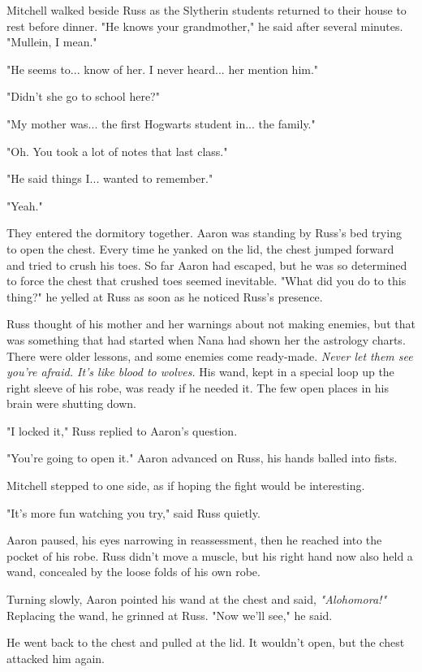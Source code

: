 \documentclass[a4paper,11pt]{article}
\begin{document}
Mitchell walked beside Russ as the Slytherin students returned to their house to rest before dinner. "He knows your grandmother," he said after several minutes. "Mullein, I mean."

"He seems to... know of her. I never heard... her mention him."

"Didn't she go to school here?"

"My mother was... the first Hogwarts student in... the family."

"Oh. You took a lot of notes that last class."

"He said things I... wanted to remember."

"Yeah."

They entered the dormitory together. Aaron was standing by Russ's bed trying to open the chest. Every time he yanked on the lid, the chest jumped forward and tried to crush his toes. So far Aaron had escaped, but he was so determined to force the chest that crushed toes seemed inevitable. "What did you do to this thing?" he yelled at Russ as soon as he noticed Russ's presence.

Russ thought of his mother and her warnings about not making enemies, but that was something that had started when Nana had shown her the astrology charts. There were older lessons, and some enemies come ready-made. \emph{Never let them see you're afraid. It's like blood to wolves.} His wand, kept in a special loop up the right sleeve of his robe, was ready if he needed it. The few open places in his brain were shutting down.

"I locked it," Russ replied to Aaron's question.

"You're going to open it." Aaron advanced on Russ, his hands balled into fists.

Mitchell stepped to one side, as if hoping the fight would be interesting.

"It's more fun watching you try," said Russ quietly.

Aaron paused, his eyes narrowing in reassessment, then he reached into the pocket of his robe. Russ didn't move a muscle, but his right hand now also held a wand, concealed by the loose folds of his own robe.

Turning slowly, Aaron pointed his wand at the chest and said, \emph{"Alohomora!"} Replacing the wand, he grinned at Russ. "Now we'll see," he said.

He went back to the chest and pulled at the lid. It wouldn't open, but the chest attacked him again.
\end{document}
